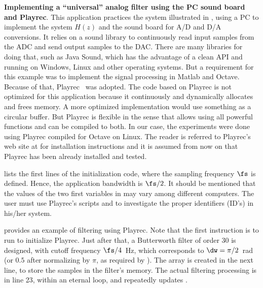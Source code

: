 \bApplication \textbf{Implementing a ``universal'' analog filter using the PC sound board and Playrec}.
\label{app:playrec}
This application practices the system illustrated in , using a PC to implement the system $H(z)$ and the sound board for A/D and D/A conversions. It relies on a sound library to continuously read input samples from the ADC and send output samples to the DAC. There are many libraries for doing that, such as Java Sound, which has the advantage of a clean API and running on Windows, Linux and other operating systems. But a requirement for this example was to implement the signal processing in Matlab and Octave. Because of that, Playrec~ was adopted. The code based on Playrec is not optimized for this application because it continuously and dynamically allocates and frees memory. A more optimized implementation would use something as a circular buffer. But Playrec is flexible in the sense that allows using all {\matlab} powerful functions and can be compiled to both. In our case, the experiments were done using Playrec compiled for Octave on Linux. The reader is referred to Playrec's web site at   for installation instructions and it is assumed from now on that Playrec has been already installed and tested.

 lists the first lines of the initialization code, where the sampling frequency $\fs$ is defined. Hence, the application bandwidth is $\fs/2$. It should be mentioned that the values of the two first variables in  may vary among different computers. The user must use Playrec's scripts  and  to investigate the proper identifiers (ID's) in his/her system.



 provides an example of filtering using Playrec. Note that the first instruction is to run   to initialize Playrec. Just after that, a Butterworth filter of order 30 is designed, with cutoff frequency $\fs/4$~Hz, which corresponds to $\dw=\pi/2$~rad (or $0.5$ after normalizing by $\pi$, as required by {\matlab}). The array  is created in the next line, to store the samples in the filter's memory. The actual filtering processing is in line 23, within an eternal loop, and repeatedly updates .


